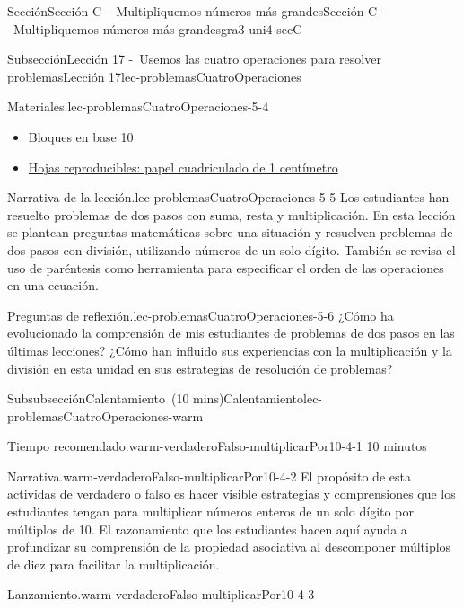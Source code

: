 \documentclass[oneside,10pt,]{article}
\begin{document}
\begin{sectionptx}{Sección}{Sección C -~Multipliquemos números más grandes}{}{Sección C -~Multipliquemos números más grandes}{}{}{gra3-uni4-secC}
\begin{subsectionptx}{Subsección}{Lección 17 -~Usemos las cuatro operaciones para resolver problemas}{}{Lección 17}{}{}{lec-problemasCuatroOperaciones}
\begin{introduction}{}
\begin{paragraphs}{Materiales.}{lec-problemasCuatroOperaciones-5-4}
\begin{itemize}[label=\textbullet]
\begin{itemize}[label=$\circ$]
\item{}Bloques en base 10%
\item{}\hyperref[blm-papelCuadriculadoCentimetro]{Hojas reproducibles: papel cuadriculado de 1 centímetro}%
\end{itemize}
\end{itemize}
\end{paragraphs}%
\begin{paragraphs}{Narrativa de la lección.}{lec-problemasCuatroOperaciones-5-5}%
Los estudiantes han resuelto problemas de dos pasos con suma, resta y multiplicación. En esta lección se plantean preguntas matemáticas sobre una situación y resuelven problemas de dos pasos con división, utilizando números de un solo dígito. También se revisa el uso de paréntesis como herramienta para especificar el orden de las operaciones en una ecuación.%
\end{paragraphs}%
\begin{paragraphs}{Preguntas de reflexión.}{lec-problemasCuatroOperaciones-5-6}%
¿Cómo ha evolucionado la comprensión de mis estudiantes de problemas de dos pasos en las últimas lecciones? ¿Cómo han influido sus experiencias con la multiplicación y la división en esta unidad en sus estrategias de resolución de problemas?%
\end{paragraphs}%
\end{introduction}%
%
%
\typeout{************************************************}
\typeout{************************************************}
%
\begin{subsubsectionptx}{Subsubsección}{Calentamiento~(10 mins)}{}{Calentamiento}{}{}{lec-problemasCuatroOperaciones-warm}
\par
\begin{paragraphs}{Tiempo recomendado.}{warm-verdaderoFalso-multiplicarPor10-4-1}%
10 minutos%
\end{paragraphs}%
\begin{paragraphs}{Narrativa.}{warm-verdaderoFalso-multiplicarPor10-4-2}%
El propósito de esta actividas de verdadero o falso es hacer visible estrategias y comprensiones que los estudiantes tengan para multiplicar números enteros de un solo dígito por múltiplos de 10. El razonamiento que los estudiantes hacen aquí ayuda a profundizar su comprensión de la propiedad asociativa al descomponer múltiplos de diez para facilitar la multiplicación.%
\end{paragraphs}%
\begin{paragraphs}{Lanzamiento.}{warm-verdaderoFalso-multiplicarPor10-4-3}%

\end{paragraphs}
\end{subsubsectionptx}
\end{subsectionptx}
\end{sectionptx}
\end{document}
